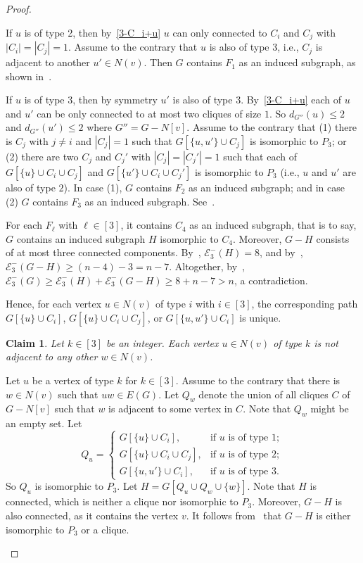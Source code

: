 \documentclass[a4paper,12pt]{article}
\theoremstyle{plain}
\newtheorem{claim}{Claim}[section]
\newenvironment{proof*}{\noindent \emph{Proof of the claim.}}{\hfill$\Diamond$}
\begin{document}
\begin{proof}
\begin{proof*}
If $u$ is of type 2, then by~\ref{3-C_i+u} $u$ can only connected to $C_i$ and $C_j$ with $|C_i|=|C_j|=1$. Assume to the contrary that $u$ is also of type 3, i.e., $C_j$ is adjacent to another $u'\in N(v)$. Then $G$ contains $F_1$ as an induced subgraph, as shown in~. 

If $u$ is of type 3, then by symmetry $u'$ is also of type 3. By~\ref{3-C_i+u} each of $u$ and $u'$ can be only connected to at most two cliques of size $1$. So $d_{G''}(u)\leq 2$ and $d_{G''}(u')\leq 2$ where $G''=G-N[v]$. Assume to the contrary that (1) there is $C_j$ with $j\neq i$ and $|C_j|=1$ such that $G[\{u, u'\}\cup C_j]$ is isomorphic to $P_3$; or (2) there are two $C_j$ and $C_j'$ with $|C_j|=|C_j'|=1$ such that each of $G[\{u\}\cup C_i\cup C_j]$ and $G[\{u'\}\cup C_i\cup C_j']$ is isomorphic to $P_3$ (i.e., $u$ and $u'$ are also of type $2$). In case (1), $G$ contains $F_2$ as an induced subgraph; and in case (2) $G$ contains $F_3$ as an induced subgraph. See~.  


For each $F_\ell$ with $\ell\in[3]$, it contains $C_4$ as an induced subgraph, that is to say, $G$ contains an induced subgraph $H$ isomorphic to $C_4$. Moreover, $G-H$ consists of at most three connected components. By~, $\mathcal{E}_3^{-}(H)=8$, and by~, $\mathcal{E}_3^{-}(G-H)\geq (n-4)-3=n-7$. Altogether, by~, $\mathcal{E}_3^{-}(G)\geq\mathcal{E}_3^{-}(H)+\mathcal{E}_3^{-}(G-H)\geq 8+n-7>n$, a contradiction. 
\end{proof*}


Hence, for each vertex $u\in N(v)$ of type $i$ with $i\in [3]$, the corresponding path $G[\{u\}\cup C_i]$, $G[\{u\}\cup C_i\cup C_j]$, or $G[\{u,u'\}\cup C_i]$ is unique. 

\begin{claim}\label{claim:NonAdjacentP3}
Let $k\in [3]$ be an integer. Each vertex $u\in N(v)$ of type $k$ is not adjacent to any other $w\in N(v)$.
\end{claim}

\begin{proof*}
Let $u$ be a vertex of type $k$ for $k\in [3]$. Assume to the contrary that there is $w\in N(v)$ such that $uw\in E(G)$. Let $Q_w$ denote the union of all cliques $C$ of $G-N[v]$ such that $w$ is adjacent to some vertex in $C$. Note that $Q_w$ might be an empty set. Let $$
    Q_u =
        \begin{cases}
            G[\{u\}\cup C_i], & \text{if $u$ is of type 1};\\
            G[\{u\}\cup C_i\cup C_j], & \text{if $u$ is of type 2};\\
            G[\{u,u'\}\cup C_i], & \text{if $u$ is of type 3}.
        \end{cases}
    $$ So $Q_u$ is isomorphic to $P_3$. Let $H=G[Q_u\cup Q_w \cup \{w\}]$. Note that $H$ is connected, which is neither a clique nor isomorphic to $P_3$. Moreover, $G-H$ is also connected, as it contains the vertex $v$. It follows from~ that $G-H$ is either isomorphic to $P_3$ or a clique. 


\end{proof*}
\end{proof}
\end{document}
